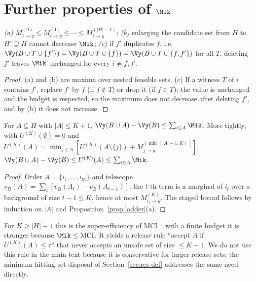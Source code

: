 \section{Further properties of $\Mik$}\label{app:proofs}

\begin{proposition}\label{prop:ladder}
\emph{(a)} $M^{(0)}_{i\to y}\le M^{(1)}_{i\to y}\le\cdots\le M^{(|H|-1)}_{i\to y}$;
\emph{(b)} enlarging the candidate set from $H$ to $H'\supseteq H$ cannot decrease $\Mik$;
\emph{(c)} if $f'$ duplicates $f$, i.e.\ $\Vy(B\cup T\cup\{f'\})=\Vy(B\cup T\cup\{f\})=\Vy(B\cup T\cup\{f,f'\})$
for all $T$, deleting $f'$ leaves $\Mik$ unchanged for every $i\ne f,f'$.
\end{proposition}
\begin{proof}
(a) and (b) are maxima over nested feasible sets. (c) If a witness $T$ of $i$ contains $f'$,
replace $f'$ by $f$ (if $f\notin T$) or drop it (if $f\in T$); the value is unchanged and the budget
is respected, so the maximum does not decrease after deleting $f'$, and by (b) it does not increase.
\end{proof}

\begin{theorem}\label{thm:super}
For $A\subseteq H$ with $|A|\le K+1$, $\Vy(B\cup A)-\Vy(B)\le\sum_{i\in A}\Mik$. More tightly, with
$U^{(K)}(\emptyset)=0$ and $U^{(K)}(A)=\min_{j\in A}[U^{(K)}(A\setminus\{j\})+M^{(\min(|A|-1,K))}_{j\to y}]$,
$\Vy(B\cup A)-\Vy(B)\le U^{(K)}(A)\le\sum_{i\in A}\Mik$.
\end{theorem}
\begin{proof}
Order $A=\{i_1,\dots,i_m\}$ and telescope $v_B(A)=\sum_t[v_B(A_t)-v_B(A_{t-1})]$; the $t$-th term is a
marginal of $i_t$ over a background of size $t-1\le K$, hence at most $M^{(K)}_{i_t\to y}$. The staged
bound follows by induction on $|A|$ and Proposition~\ref{prop:ladder}(a).
\end{proof}
For $K\ge|H|-1$ this is the super-efficiency of MCI~\cite{catav2021mci}; with a finite budget it is
stronger because $\Mik\le\mathrm{MCI}$. It yields a release rule ``accept $A$ if $U^{(K)}(A)\le\tau$''
that never accepts an unsafe set of size $\le K+1$. We do not use this rule in the main text because
it is conservative for larger release sets; the minimum-hitting-set disposal of
Section~\ref{sec:res-def} addresses the same need directly.

